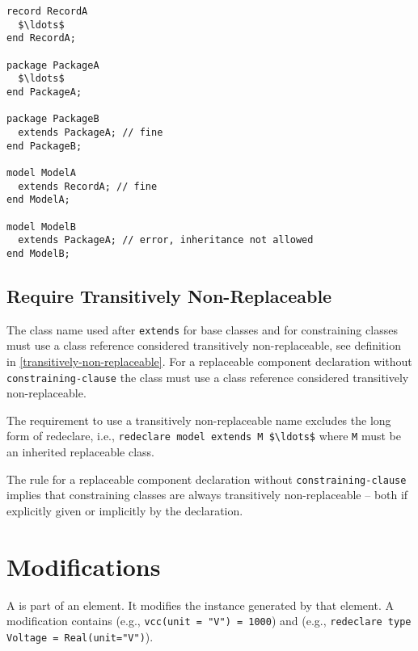 \begin{example}
\begin{lstlisting}[language=modelica]
record RecordA
  $\ldots$
end RecordA;

package PackageA
  $\ldots$
end PackageA;

package PackageB
  extends PackageA; // fine
end PackageB;

model ModelA
  extends RecordA; // fine
end ModelA;

model ModelB
  extends PackageA; // error, inheritance not allowed
end ModelB;
\end{lstlisting}
\end{example}

\subsection{Require Transitively Non-Replaceable}\label{restrictions-on-base-classes-and-constraining-types-to-be-transitively-non-replaceable}\label{require-transitively-non-replaceable}

The class name used after \lstinline!extends! for base classes and for constraining classes must use a class reference considered transitively non-replaceable, see definition in \cref{transitively-non-replaceable}.
For a replaceable component declaration without \lstinline[language=grammar]!constraining-clause! the class must use a class reference considered transitively non-replaceable.

\begin{nonnormative}
The requirement to use a transitively non-replaceable name excludes the long form of redeclare, i.e., \lstinline!redeclare model extends M $\ldots$! where \lstinline!M! must be an inherited replaceable class.
\end{nonnormative}

\begin{nonnormative}
The rule for a replaceable component declaration without \lstinline[language=grammar]!constraining-clause! implies that constraining classes are always transitively non-replaceable -- both
if explicitly given or implicitly by the declaration.
\end{nonnormative}

\section{Modifications}\label{modifications}

A  is part of an element.
It modifies the instance generated by that element.
A modification contains  (e.g., \lstinline!vcc(unit = "V") = 1000!) and  (e.g., \lstinline!redeclare type Voltage = Real(unit="V")!).

